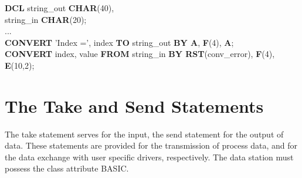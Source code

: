 {\bf DCL} string\_out {\bf CHAR}(40),\\
\x string\_in {\bf CHAR}(20);\\
...\\
{\bf CONVERT} 'Index =', index {\bf TO} string\_out 
    {\bf BY A}, {\bf F}(4), {\bf A};\\
{\bf CONVERT} index, value {\bf FROM} string\_in {\bf BY RST}(conv\_error), {\bf F}(4), {\bf E}(10,2);


\section{The Take and Send Statements}    %
\label{sec_take_send}

The take statement serves for the input, the send statement for the
output of data. These statements are provided for the transmission of
process data, and for the data exchange with user specific drivers,
respectively. The data station must possess the class attribute BASIC.

